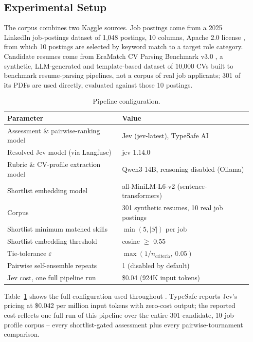 \documentclass[journal]{IEEEtran}
\begin{document}
\subsection{Experimental Setup}
The corpus combines two Kaggle sources. Job postings come from a 2025 LinkedIn job-postings dataset of 1,048 postings, 10 columns, Apache 2.0 license \cite{ref24}, from which 10 postings are selected by keyword match to a target role category. Candidate resumes come from EraMatch CV Parsing Benchmark v3.0 \cite{ref25}, a synthetic, LLM-generated and template-based dataset of 10,000 CVs built to benchmark resume-parsing pipelines, not a corpus of real job applicants; 301 of its PDFs are used directly, evaluated against those 10 postings.

\begin{table}[H]
\caption{Pipeline configuration.}
\label{tab_config}
\centering
\footnotesize
\begin{tabular}{p{1.5in}p{1.6in}}
\hline
Parameter & Value\\
\hline
Assessment \& pairwise-ranking model & Jev (jev-latest), TypeSafe AI\\
Resolved Jev model (via Langfuse) & jev-1.14.0\\
Rubric \& CV-profile extraction model & Qwen3-14B, reasoning disabled (Ollama)\\
Shortlist embedding model & all-MiniLM-L6-v2 (sentence-transformers)\\
Corpus & 301 synthetic resumes, 10 real job postings\\
Shortlist minimum matched skills & $\min(5, |S|)$ per job\\
Shortlist embedding threshold & cosine $\geq$ 0.55\\
Tie-tolerance $\varepsilon$ & $\max(1/n_{\text{criteria}},\ 0.05)$\\
Pairwise self-ensemble repeats & 1 (disabled by default)\\
Jev cost, one full pipeline run & \$0.04 (924K input tokens)\\
\hline
\end{tabular}
\end{table}
Table~\ref{tab_config} shows the full configuration used throughout \cite{ref6}. TypeSafe reports Jev's pricing at \$0.042 per million input tokens with zero-cost output; the reported cost reflects one full run of this pipeline over the entire 301-candidate, 10-job-profile corpus -- every shortlist-gated assessment plus every pairwise-tournament comparison.
\end{document}
